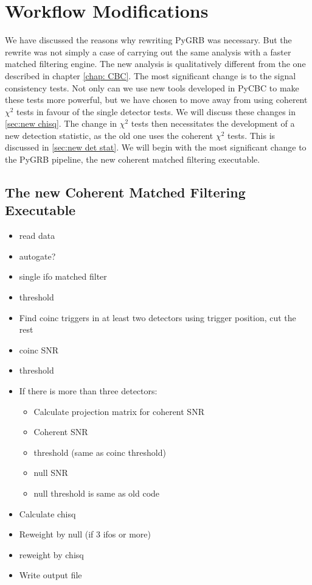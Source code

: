 \documentclass[11pt]{cuthesis}
\begin{document}
\section{Workflow Modifications} \label{sec:pygrb changes}
We have discussed the reasons why rewriting PyGRB was necessary. But the rewrite was not simply a case of carrying out the same analysis with a faster matched filtering engine. The new analysis is qualitatively different from the one described in chapter \ref{chap: CBC}. The most significant change is to the signal consistency tests. Not only can we use new tools developed in PyCBC to make these tests more powerful, but we have chosen to move away from using coherent $\chi^2$ tests in favour of the single detector tests. We will discuss these changes in \ref{sec:new chisq}. The change in $\chi^2$ tests then necessitates the development of a new detection statistic, as the old one uses the coherent $\chi^2$ tests. This is discussed in \ref{sec:new det stat}. We will begin with the most significant change to the PyGRB pipeline, the new coherent matched filtering executable.

\subsection{The new Coherent Matched Filtering Executable}
\begin{itemize}
\item read data
\item autogate?
\item single ifo matched filter
\item threshold
\item Find coinc triggers in at least two detectors using trigger position, cut the rest
\item coinc SNR
\item threshold
\item If there is more than three detectors:
\begin{itemize}
\item Calculate projection matrix for coherent SNR
\item Coherent SNR
\item threshold (same as coinc threshold)
\item null SNR
\item null threshold is same as old code
\end{itemize}
\item Calculate chisq
\item Reweight by null (if 3 ifos or more)
\item reweight by chisq
\item Write output file
\end{itemize}
\end{document}
